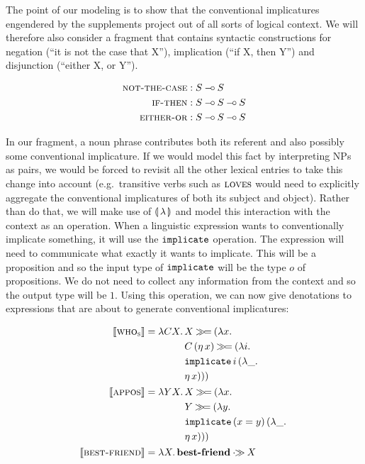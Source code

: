 The point of our modeling is to show that the conventional implicatures
engendered by the supplements project out of all sorts of logical
context. We will therefore also consider a fragment that contains syntactic
constructions for negation (``it is not the case that X''), implication
(``if X, then Y'') and disjunction (``either X, or Y'').

\begin{align*}
  \textsc{not-the-case} &: S \mathbin{{-}\mkern-3.5mu{\circ}} S \\
  \textsc{if-then} &: S \mathbin{{-}\mkern-3.5mu{\circ}} S \mathbin{{-}\mkern-3.5mu{\circ}} S \\
  \textsc{either-or} &: S \mathbin{{-}\mkern-3.5mu{\circ}} S \mathbin{{-}\mkern-3.5mu{\circ}} S
\end{align*}

In our fragment, a noun phrase contributes both its referent and also
possibly some conventional implicature. If we would model this fact by
interpreting NPs as pairs, we would be forced to revisit all the other
lexical entries to take this change into account (e.g.\ transitive verbs
such as $\textsc{loves}$ would need to explicitly aggregate the conventional
implicatures of both its subject and object). Rather than do that, we will
make use of $\llparenthesis \, \lambda \, \rrparenthesis$ and model this interaction with the context
as an operation. When a linguistic expression wants to conventionally
implicate something, it will use the $\mathtt{implicate}$ operation. The
expression will need to communicate what exactly it wants to
implicate. This will be a proposition and so the input type of
$\mathtt{implicate}$ will be the type $o$ of propositions. We do not need to
collect any information from the context and so the output type will be
$1$. Using this operation, we can now give denotations to expressions that
are about to generate conventional implicatures:

\begin{align*}
  \llbracket \textsc{who}_{\textsc{s}} \rrbracket &= \lambda C X.\, \begin{aligned}[t]
      &X \mathbin{\gg\!=} (\lambda x.\,  \\
      &C\,(\eta\,x) \mathbin{\gg\!=} (\lambda i.\,  \\
      &\mathtt{implicate}\,i\,(\lambda \_.\,  \\
      &\eta\,x)))
    \end{aligned} \\
  \llbracket \textsc{appos} \rrbracket &= \lambda Y X.\, \begin{aligned}[t]
      &X \mathbin{\gg\!=} (\lambda x.\,  \\
      &Y \mathbin{\gg\!=} (\lambda y.\,  \\
      &\mathtt{implicate}\,(x = y)\,(\lambda \_.\,  \\
      &\eta\,x)))
    \end{aligned} \\
  \llbracket \textsc{best-friend} \rrbracket &= \lambda X.\, \textbf{best-friend} \mathbin{\cdot\!\!\gg} X
\end{align*}

